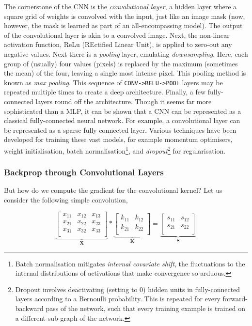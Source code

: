 \documentclass[11pt]{amsart}
\begin{document}
The cornerstone of the CNN is the \emph{convolutional layer}, a hidden layer where a square grid of weights is convolved with the input, just like an image mask (now, however, the mask is learned as part of an all-encompassing model). The output of the convolutional layer is akin to a convolved image. Next, the non-linear activation function, ReLu (REctified Linear Unit), is applied to zero-out any negative values. Next there is a \emph{pooling} layer, emulating \emph{downsampling}. Here, each group of (usually) four values (pixels) is replaced by the maximum (sometimes the mean) of the four, leaving a single most intense pixel. This pooling method is known as \emph{max pooling}. This sequence of \texttt{CONV->RELU->POOL} layers may be repeated multiple times to create a deep architecture. Finally, a few fully-connected layers round off the architecture. Though it seems far more sophisticated than a MLP, it can be shown that a CNN can be represented as a classical fully-connected neural network. For example, a convolutional layer can be represented as a sparse fully-connected layer. Various techniques have been developed for training these vast models, for example momentum optimisers, weight initialisation, batch normalisation\footnote{Batch normalisation mitigates \emph{internal covariate shift}, the fluctuations to the internal distributions of activations that make convergence so arduous.}, and \emph{dropout}\footnote{Dropout involves deactivating (setting to $0$) hidden units in fully-connected layers according to a Bernoulli probability. This is repeated for every forward-backward pass of the network, such that every training example is trained on a different sub-graph of the network.} for regularisation.

\subsubsection{Backprop through Convolutional Layers}

But how do we compute the gradient for the convolutional kernel? Let us consider the following simple convolution,

$$
\underbrace{\begin{bmatrix}
x_{11} & x_{12} & x_{13} \\
x_{21} & x_{22} & x_{23} \\
x_{31} & x_{32} & x_{33} \\
\end{bmatrix}}_{\mathbf{X}} * 
\underbrace{\begin{bmatrix}
k_{11} & k_{12} \\
k_{21} & k_{22} \\
\end{bmatrix}}_{\mathbf{K}} =
\underbrace{\begin{bmatrix}
s_{11} & s_{12} \\
s_{21} & s_{22} \\
\end{bmatrix}}_{\mathbf{S}}
$$
\end{document}
